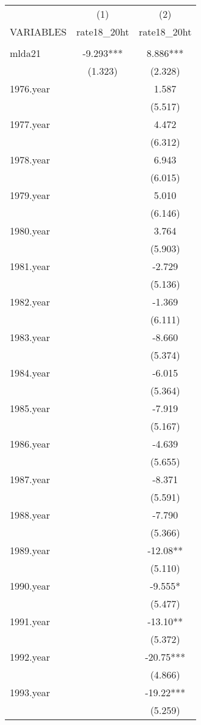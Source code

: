 \begin{tabular}{lcc} \hline
 & (1) & (2) \\
VARIABLES & rate18\_20ht & rate18\_20ht \\ \hline
 &  &  \\
mlda21 & -9.293*** & 8.886*** \\
 & (1.323) & (2.328) \\
1976.year &  & 1.587 \\
 &  & (5.517) \\
1977.year &  & 4.472 \\
 &  & (6.312) \\
1978.year &  & 6.943 \\
 &  & (6.015) \\
1979.year &  & 5.010 \\
 &  & (6.146) \\
1980.year &  & 3.764 \\
 &  & (5.903) \\
1981.year &  & -2.729 \\
 &  & (5.136) \\
1982.year &  & -1.369 \\
 &  & (6.111) \\
1983.year &  & -8.660 \\
 &  & (5.374) \\
1984.year &  & -6.015 \\
 &  & (5.364) \\
1985.year &  & -7.919 \\
 &  & (5.167) \\
1986.year &  & -4.639 \\
 &  & (5.655) \\
1987.year &  & -8.371 \\
 &  & (5.591) \\
1988.year &  & -7.790 \\
 &  & (5.366) \\
1989.year &  & -12.08** \\
 &  & (5.110) \\
1990.year &  & -9.555* \\
 &  & (5.477) \\
1991.year &  & -13.10** \\
 &  & (5.372) \\
1992.year &  & -20.75*** \\
 &  & (4.866) \\
1993.year &  & -19.22*** \\
 &  & (5.259) \\

\end{tabular}
